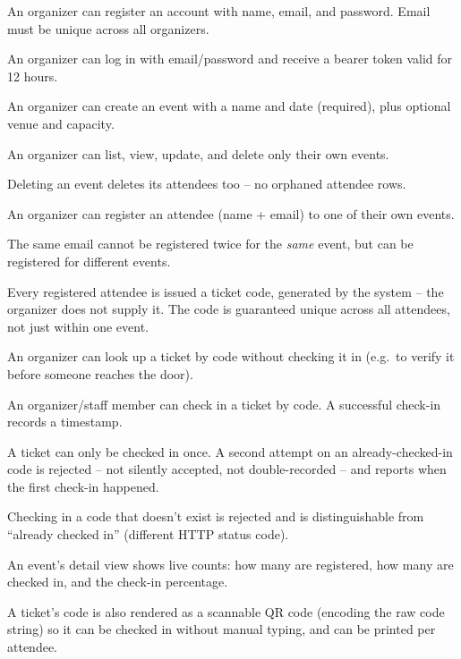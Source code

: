 ﻿\documentclass[11pt,letterpaper]{report}
\begin{document}
\begin{description}[leftmargin=3.2em, style=nextline]
  \item[FR1] An organizer can register an account with name, email,
    and password. Email must be unique across all organizers.
  \item[FR2] An organizer can log in with email/password and receive a
    bearer token valid for 12 hours.
  \item[FR3] An organizer can create an event with a name and date
    (required), plus optional venue and capacity.
  \item[FR4] An organizer can list, view, update, and delete only
    their own events.
  \item[FR5] Deleting an event deletes its attendees too -- no
    orphaned attendee rows.
  \item[FR6] An organizer can register an attendee (name + email) to
    one of their own events.
  \item[FR7] The same email cannot be registered twice for the
    \emph{same} event, but can be registered for different events.
  \item[FR8] Every registered attendee is issued a ticket code,
    generated by the system -- the organizer does not supply it. The
    code is guaranteed unique across all attendees, not just within
    one event.
  \item[FR9] An organizer can look up a ticket by code without
    checking it in (e.g.\ to verify it before someone reaches the
    door).
  \item[FR10] An organizer/staff member can check in a ticket by code.
    A successful check-in records a timestamp.
  \item[FR11] A ticket can only be checked in once. A second attempt
    on an already-checked-in code is rejected -- not silently
    accepted, not double-recorded -- and reports when the first
    check-in happened.
  \item[FR12] Checking in a code that doesn't exist is rejected and is
    distinguishable from ``already checked in'' (different HTTP status
    code).
  \item[FR13] An event's detail view shows live counts: how many are
    registered, how many are checked in, and the check-in percentage.
  \item[FR14] A ticket's code is also rendered as a scannable QR code
    (encoding the raw code string) so it can be checked in without
    manual typing, and can be printed per attendee.
\end{description}
\end{document}
